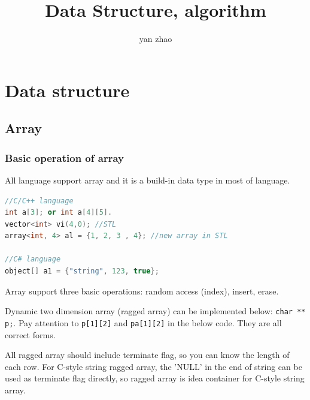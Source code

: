 \documentclass[a4paper,11pt,twoside]{book}
\begin{document}
\title{Data Structure, algorithm}
\author{yan zhao}
\date{}\maketitle

\setcounter{secnumdepth}{4}
\setcounter{tocdepth}{4}
\tableofcontents

\setlength\parindent{0pt}
\setlength{\parskip}{5pt}



\chapter{Data structure} 

\section{Array}

\subsection{Basic operation of array}

	All language support array and it is a build-in data type in most of language.  
\begin{lstlisting}[frame=single, language=c++]
//C/C++ language
int a[3]; or int a[4][5].  
vector<int> vi(4,0); //STL
array<int, 4> al = {1, 2, 3 , 4}; //new array in STL
  
//C# language 
object[] a1 = {"string", 123, true};
\end{lstlisting}

	\par Array support three basic operations: random access (index), insert, erase.  

	\par Dynamic two dimension array (ragged array) can be implemented below:  \texttt{char ** p;}. Pay attention to \texttt{p[1][2]} and \texttt{pa[1][2]} in the below code. They are all correct forms.

	\par All ragged array should include terminate flag, so you can know the length of each row.  For C-style string ragged array, the 'NULL' in the end of string can be used as terminate flag directly, so ragged array is idea container for C-style string array. 
\end{document}
